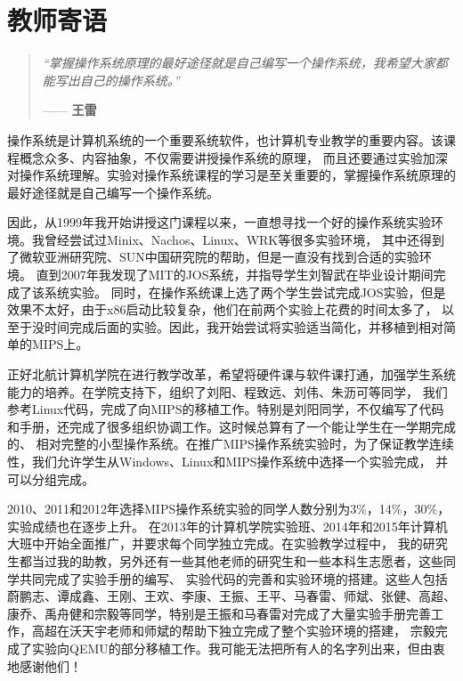 \chapter{教师寄语}

\begin{quotation}
  \begin{flushleft}
{\textit{“掌握操作系统原理的最好途径就是自己编写一个操作系统，我希望大家都能写出自己的操作系统。”} } \par
\begin{flushright}
—— {\textbf{王雷}}
\end{flushright}
  \end{flushleft}
\end{quotation}

操作系统是计算机系统的一个重要系统软件，也计算机专业教学的重要内容。该课程概念众多、内容抽象，不仅需要讲授操作系统的原理，
而且还要通过实验加深对操作系统理解。实验对操作系统课程的学习是至关重要的，掌握操作系统原理的最好途径就是自己编写一个操作系统。

因此，从1999年我开始讲授这门课程以来，一直想寻找一个好的操作系统实验环境。我曾经尝试过Minix、Nachos、Linux、WRK等很多实验环境，
其中还得到了微软亚洲研究院、SUN中国研究院的帮助，但是一直没有找到合适的实验环境。
直到2007年我发现了MIT的JOS系统，并指导学生刘智武在毕业设计期间完成了该系统实验。
同时，在操作系统课上选了两个学生尝试完成JOS实验，但是效果不太好，由于x86启动比较复杂，他们在前两个实验上花费的时间太多了，
以至于没时间完成后面的实验。因此，我开始尝试将实验适当简化，并移植到相对简单的MIPS上。\par
正好北航计算机学院在进行教学改革，希望将硬件课与软件课打通，加强学生系统能力的培养。在学院支持下，组织了刘阳、程致远、刘伟、朱沥可等同学，
我们参考Linux代码，完成了向MIPS的移植工作。特别是刘阳同学，不仅编写了代码和手册，还完成了很多组织协调工作。这时候总算有了一个能让学生在一学期完成的、
相对完整的小型操作系统。在推广MIPS操作系统实验时，为了保证教学连续性，我们允许学生从Windows、Linux和MIPS操作系统中选择一个实验完成，
并可以分组完成。\par
2010、2011和2012年选择MIPS操作系统实验的同学人数分别为3\%，14\%，30\%，实验成绩也在逐步上升。
在2013年的计算机学院实验班、2014年和2015年计算机大班中开始全面推广，并要求每个同学独立完成。在实验教学过程中，
我的研究生都当过我的助教，另外还有一些其他老师的研究生和一些本科生志愿者，这些同学共同完成了实验手册的编写、
实验代码的完善和实验环境的搭建。这些人包括蔚鹏志、谭成鑫、王刚、王欢、李康、王振、王平、马春雷、师斌、张健、高超、
康乔、禹舟健和宗毅等同学，特别是王振和马春雷对完成了大量实验手册完善工作，高超在沃天宇老师和师斌的帮助下独立完成了整个实验环境的搭建，
宗毅完成了实验向QEMU的部分移植工作。我可能无法把所有人的名字列出来，但由衷地感谢他们！

